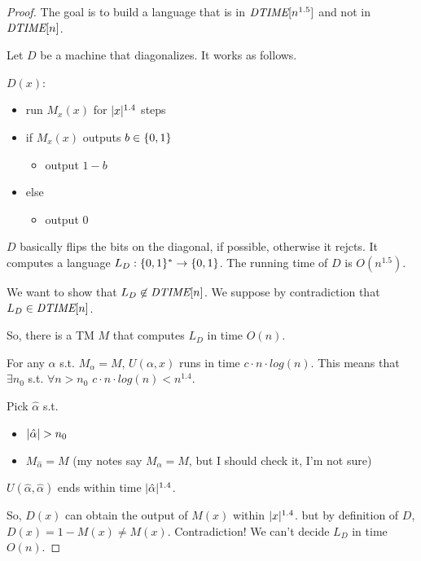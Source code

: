     \begin{proof}
        The goal is to build a language that is in $\textit{DTIME}[n^{1.5}]$ and not in $\textit{DTIME}[n]$.

        Let $D$ be a machine that diagonalizes. It works as follows.

        $D(x)$:
        \begin{itemize}
            \item run $M_x(x)$ for $\vert x \vert^{1.4}$ steps
            \item if $M_x(x)$ outputs $b \in \{ 0,1 \}$
                \begin{itemize}
                    \item output $1-b$
                \end{itemize}
            \item else
                \begin{itemize}
                    \item output $0$
                \end{itemize}
        \end{itemize}

        $D$ basically flips the bits on the diagonal, if possible, otherwise it rejcts.
        It computes a language $L_D : \{ 0,1 \}^* \rightarrow \{ 0,1 \}$. The running time of $D$ is $O(n^{1.5})$.

        We want to show that $L_D \not\in \textit{DTIME}[n]$.
        We suppose by contradiction that $L_D \in \textit{DTIME}[n]$.

        So, there is a TM $M$ that computes $L_D$ in time $O(n)$.

        For any $\alpha$ s.t. $M_\alpha = M$, $U(\alpha, x)$ runs in time $c \cdot n \cdot log(n)$.
        This means that $\exists n_0$ s.t. $\forall n > n_0$ $c \cdot n \cdot log(n) < n^{1.4}$.

        \def\halpha{\hat{\alpha}}
        Pick $\halpha$ s.t.
        \begin{itemize}
            \item $\cardinality{\halpha} > n_0$
            \item $M_{\halpha} = M$ (my notes say $M_\alpha = M$, but I should check it, I'm not sure)
        \end{itemize}

        $U(\halpha, \halpha)$ ends within time $\cardinality{\halpha}^{1.4}$.

        So, $D(x)$ can obtain the output of $M(x)$ within $\vert x \vert^{1.4}$. but by definition of $D$, $D(x) = 1 - M(x) \neq M(x)$. Contradiction!
        We can't decide $L_D$ in time $O(n)$.
    \end{proof}

